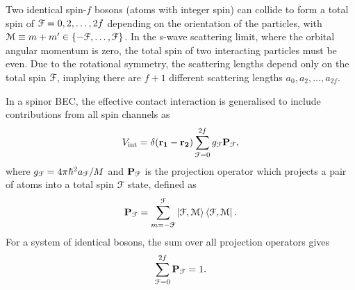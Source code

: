 Two identical spin-\(f\) bosons (atoms with integer spin) can collide to form a
total spin of \(\EuScript{F} = 0, 2, \ldots, 2f\) depending on the orientation
of the particles, with \(\EuScript{M} \equiv m+m' \in
\{-\EuScript{F}, \ldots, \EuScript{F}\}\).
In the s-wave scattering limit, where the orbital angular momentum is zero,
the total spin of two interacting particles must be even.
Due to the rotational symmetry, the scattering lengths depend only on the total
spin \(\EuScript{F}\), implying there are \(f + 1\) different scattering lengths
\(a_0, a_2, \ldots, a_{2f}\).

In a spinor BEC, the effective contact interaction is generalised to include
contributions from all spin channels as
\begin{equation}\label{eq: spin-f-interaction-potential}
    V_\mathrm{int} = \delta(\vb{r_1} - \vb{r_2})
    \sum_{\EuScript{F}=0}^{2f}g_\EuScript{F}\vb{P}_\EuScript{F},
\end{equation}
where \(g_\EuScript{F}=4\pi\hbar^2a_\EuScript{F}/M\) and
\(\vb{P}_\EuScript{F}\) is the projection operator which projects a pair
of atoms into a total spin \(\EuScript{F}\) state, defined as
\begin{equation}
    \vb{P}_\EuScript{F} = \sum_{m=-\EuScript{F}}^{\EuScript{F}}
    \ket{\EuScript{F}, \EuScript{M}}\bra{\EuScript{F}, \EuScript{M}}.
\end{equation}
For a system of identical bosons, the sum over all projection operators gives
\begin{equation}\label{eq: completeness-relation}
    \sum_{\EuScript{F}=0}^{2f}\vb{P}_\EuScript{F} = 1.
\end{equation}


